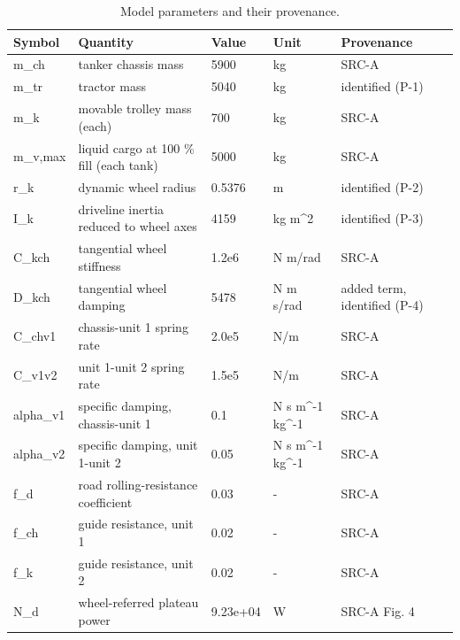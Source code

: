 \begin{table}
\caption{Model parameters and their provenance.}
\label{tab:table01_parameters}
\begin{tabular}{lllll}
\toprule
Symbol & Quantity & Value & Unit & Provenance \\
\midrule
m\_ch & tanker chassis mass & 5900 & kg & SRC-A \\
m\_tr & tractor mass & 5040 & kg & identified (P-1) \\
m\_k & movable trolley mass (each) & 700 & kg & SRC-A \\
m\_v,max & liquid cargo at 100 \% fill (each tank) & 5000 & kg & SRC-A \\
r\_k & dynamic wheel radius & 0.5376 & m & identified (P-2) \\
I\_k & driveline inertia reduced to wheel axes & 4159 & kg m\textasciicircum 2 & identified (P-3) \\
C\_kch & tangential wheel stiffness & 1.2e6 & N m/rad & SRC-A \\
D\_kch & tangential wheel damping & 5478 & N m s/rad & added term, identified (P-4) \\
C\_chv1 & chassis-unit 1 spring rate & 2.0e5 & N/m & SRC-A \\
C\_v1v2 & unit 1-unit 2 spring rate & 1.5e5 & N/m & SRC-A \\
alpha\_v1 & specific damping, chassis-unit 1 & 0.1 & N s m\textasciicircum -1 kg\textasciicircum -1 & SRC-A \\
alpha\_v2 & specific damping, unit 1-unit 2 & 0.05 & N s m\textasciicircum -1 kg\textasciicircum -1 & SRC-A \\
f\_d & road rolling-resistance coefficient & 0.03 & - & SRC-A \\
f\_ch & guide resistance, unit 1 & 0.02 & - & SRC-A \\
f\_k & guide resistance, unit 2 & 0.02 & - & SRC-A \\
N\_d & wheel-referred plateau power & 9.23e+04 & W & SRC-A Fig. 4 \\
\bottomrule
\end{tabular}
\end{table}
